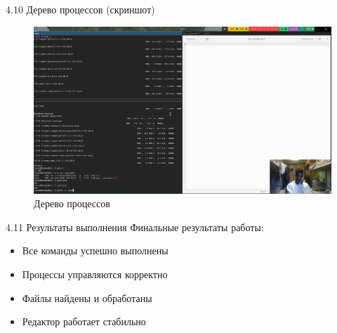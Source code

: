 \documentclass[
  ignorenonframetext,
  aspectratio=169,
  russian,
]{beamer}
\providecommand{\tightlist}{%
  \setlength{\itemsep}{0pt}\setlength{\parskip}{0pt}}
\begin{document}
\begin{frame}{4.10 Дерево процессов (скриншот)}
\label{ux434ux435ux440ux435ux432ux43e-ux43fux440ux43eux446ux435ux441ux441ux43eux432-ux441ux43aux440ux438ux43dux448ux43eux442}
\begin{figure}[H]

{\centering \includegraphics[width=0.8\linewidth,height=\textheight,keepaspectratio]{image/pstree.png}

}

\caption{Дерево процессов}

\end{figure}%
\end{frame}

\begin{frame}{4.11 Результаты выполнения}
\label{ux440ux435ux437ux443ux43bux44cux442ux430ux442ux44b-ux432ux44bux43fux43eux43bux43dux435ux43dux438ux44f}
Финальные результаты работы:

\begin{itemize}[<+->]
\tightlist
\item
  Все команды успешно выполнены
\item
  Процессы управляются корректно
\item
  Файлы найдены и обработаны
\item
  Редактор работает стабильно
\end{itemize}
\end{frame}
\end{document}
